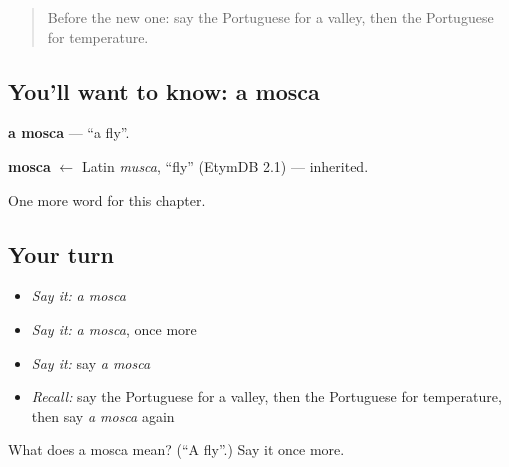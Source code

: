 \label{lesson:PT-C244-mosca}



\begin{quote}
Before the new one: say the Portuguese for a valley, then the Portuguese for temperature.
\end{quote}

\subsection*{You'll want to know: a mosca}
\textbf{a mosca} — \textquotedblleft{}a fly\textquotedblright{}.

\begin{cousinweb}
\textbf{mosca} $\leftarrow$ Latin \emph{musca}, \textquotedblleft{}fly\textquotedblright{} (EtymDB 2.1) — inherited.
\end{cousinweb}

\begin{grammarlens}[title={What you've built}]
One more word for this chapter.
\end{grammarlens}

\subsection*{Your turn}
\begin{itemize}
\raggedright
  \item \emph{Say it:} \emph{a mosca}
  \item \emph{Say it:} \emph{a mosca}, once more
  \item \emph{Say it:} say \emph{a mosca}
  \item \emph{Recall:} say the Portuguese for a valley, then the Portuguese for temperature, then say \emph{a mosca} again
\end{itemize}

\begin{tcolorbox}[breakable,colback=teal!4,colframe=teal!35!black,title={Before you move on}]
What does a mosca mean? (\textquotedblleft{}A fly\textquotedblright{}.) Say it once more.
\end{tcolorbox}

